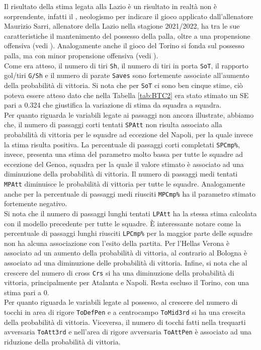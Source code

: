 Il risultato della stima legata alla Lazio è un risultato in realtà non è sorprendente, infatti il \textit{\cite{sarrismotr}}, neologismo per indicare il gioco applicato dall'allenatore Maurizio Sarri, allenatore della Lazio nella stagione 2021/2022, ha tra le sue caratteristiche il mantenimento del possesso della palla, oltre a una propensione offensiva (vedi \textit{\cite{sarrismo}}). Analogamente anche il gioco del Torino si fonda sul possesso palla, ma con minor propensione offensiva (vedi \textit{\cite{torino}}).\\
Come era atteso, il numero di tiri \texttt{Sh}, il numero di tiri in porta \texttt{SoT}, il rapporto gol/tiri \texttt{G/Sh} e il numero di parate \texttt{Saves} sono fortemente associate all'aumento della probabilità di vittoria. Si nota che per \texttt{SoT} ci sono ben cinque stime, ciò poteva essere atteso dato che nella Tabella \ref{tab:BTC2} era stato stimato un SE pari a 0.324 che giustifica la variazione di stima da squadra a squadra. \\
Per quanto riguarda le variabili legate ai passaggi non ancora illustrate, abbiamo che, il numero di passaggi corti tentati \texttt{SPAtt} non risulta associato alla probabilità di vittoria per le squadre ad eccezione del Napoli, per la quale invece la stima risulta positiva. La percentuale di passaggi corti completati \texttt{SPCmp\%}, invece, presenta una stima del parametro molto bassa per tutte le squadre ad eccezione del Genoa, squadra per la quale il valore stimato è associato ad una diminuzione della probabilità di vittoria. Il numero di passaggi medi tentati \texttt{MPAtt} diminuisce le probabilità di vittoria per tutte le squadre. Analogamente anche per la percentuale di passaggi medi riusciti \texttt{MPCmp\%} ha il parametro stimato fortemente negativo.\\
Si nota che il numero di passaggi lunghi tentati \texttt{LPAtt} ha la stessa stima calcolata con il modello precedente per tutte le squadre. È interessante notare come la percentuale di passaggi lunghi riusciti \texttt{LPCmp\%} per la maggior parte delle squadre non ha alcuna associazione con l'esito della partita. Per l'Hellas Verona è associato ad un aumento della probabilità di vittoria, al contrario al Bologna è associato ad una diminuzione delle probabilità di vittoria. Infine, si nota che al crescere del numero di cross \texttt{Crs} si ha una diminuzione della probabilità di vittoria, principalmente per Atalanta e Napoli. Resta escluso il Torino, con una stima pari a 0.\\
Per quanto riguarda le variabili legate al possesso, al crescere del numero di tocchi in area di rigore \texttt{ToDefPen} e a centrocampo \texttt{ToMid3rd} si ha una crescita della probabilità di vittoria. Viceversa, il numero di tocchi fatti nella trequarti avversaria \texttt{ToAtt3rd} e nell'area di rigore avversaria \texttt{ToAttPen} è associato ad una riduzione della probabilità di vittoria.\\

